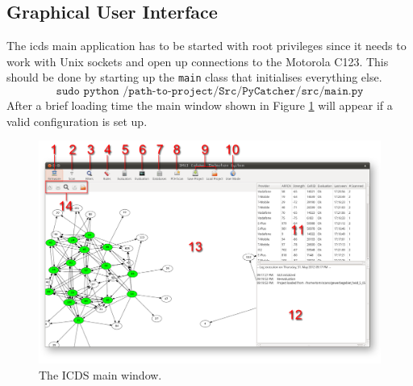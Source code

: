 \subsection{Graphical User Interface}
\label{sec:icds_operation}
The \gls{icds} main application has to be started with root privileges since it needs to work with Unix sockets and open up connections to the Motorola C123.
This should be done by starting up the \texttt{main} class that initialises everything else.
\[\texttt{sudo python /path-to-project/Src/PyCatcher/src/main.py}\]
After a brief loading time the main window shown in Figure \ref{fig:icds} will appear if a valid configuration is set up.

\begin{figure}
\centering
\includegraphics[width=\textwidth]{../Images/ICDS}
\caption{The ICDS main window.}
\label{fig:icds}
\end{figure}

